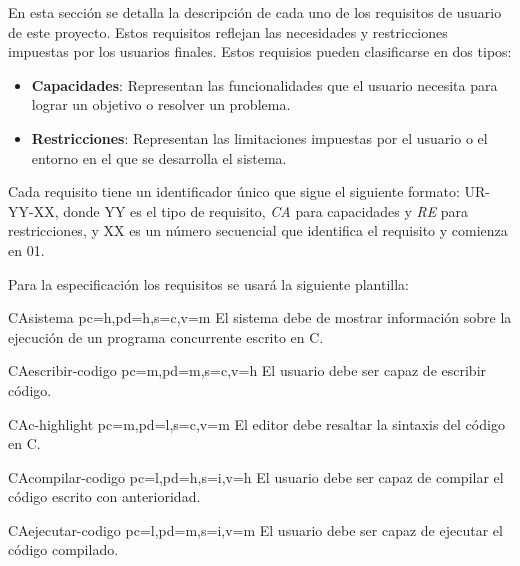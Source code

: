 En esta sección se detalla la descripción de cada uno de los requisitos de usuario de este proyecto. Estos requisitos reflejan las necesidades y restricciones impuestas por los usuarios finales. Estos requisios pueden clasificarse en dos tipos:
\begin{itemize}
    \item \textbf{Capacidades}: Representan las funcionalidades que el usuario necesita para lograr un objetivo o resolver un problema.
    \item \textbf{Restricciones}: Representan las limitaciones impuestas por el usuario o el entorno en el que se desarrolla el sistema.
\end{itemize}

Cada requisito tiene un identificador único que sigue el siguiente formato: UR-YY-XX, donde YY es el tipo de requisito, \textit{CA} para capacidades y \textit{RE} para restricciones, y XX es un número secuencial que identifica el requisito y comienza en 01.

Para la especificación los requisitos se usará la siguiente plantilla:

\printureqtemplate{}

\begin{userReq}{CA}{sistema}
    {pc=h,pd=h,s=c,v=m}
    El sistema debe de mostrar información sobre la ejecución de un \gls{programa concurrente} escrito en C.
\end{userReq}

\begin{userReq}{CA}{escribir-codigo}
    {pc=m,pd=m,s=c,v=h}
    El usuario debe ser capaz de escribir código.
\end{userReq}

\begin{userReq}{CA}{c-highlight}
    {pc=m,pd=l,s=c,v=m}
    El editor debe resaltar la sintaxis del código en C.
\end{userReq}

\begin{userReq}{CA}{compilar-codigo}
    {pc=l,pd=h,s=i,v=h}
    El usuario debe ser capaz de compilar el código escrito con anterioridad.
\end{userReq}

\begin{userReq}{CA}{ejecutar-codigo}
    {pc=l,pd=m,s=i,v=m}
    El usuario debe ser capaz de ejecutar el código compilado.
\end{userReq}

